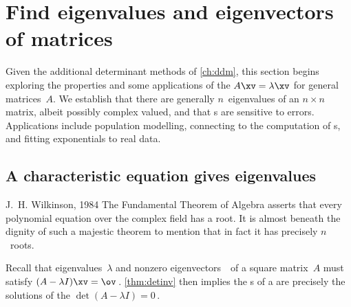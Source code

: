

\section{Find eigenvalues and eigenvectors of matrices}
\label{sec:eennm}

\secttoc

Given the additional determinant methods of \autoref{ch:ddm}, this section begins exploring the properties and some applications of the  \(A\xv=\lambda\xv\) for general matrices~\(A\).
We establish that there are generally \(n\)~eigenvalues of an \(n\times n\) matrix, albeit possibly complex valued, and that s are sensitive to errors.
Applications include population modelling, connecting to the computation of \svd{}s, and fitting exponentials to real data.




\subsection{A characteristic equation gives eigenvalues}
\label{sec:cege}

\begin{quoted}{J.~H. Wilkinson, 1984 \cite[p.103]{Higham1996}}
The Fundamental Theorem of Algebra asserts that every polynomial equation over the complex field has a root.  
It is almost beneath the dignity of such a majestic theorem to mention that in fact it has precisely \(n\)~roots.
\end{quoted}


Recall that eigenvalues~\(\lambda\) and nonzero eigenvectors~\xv\ of a square matrix~\(A\) must satisfy \((A-\lambda I)\xv=\ov\)\,.
\autoref{thm:detinv} then implies the s of a  are precisely the solutions of the  \(\det(A-\lambda I)=0\)\,.  

